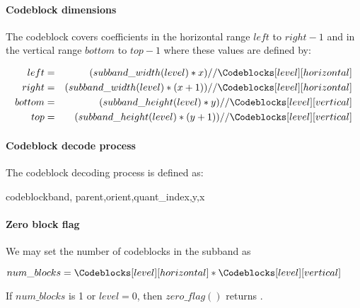 \paragraph{Codeblock dimensions\newline}

The codeblock covers coefficients in the horizontal range $left$ to $right-1$ and in the vertical
range $bottom$ to $top-1$ where these values are defined by:

\begin{eqnarray*}
  left & = & (subband\_width(level)*x)//\Codeblocks[level][horizontal] \\
  right & = & (subband\_width(level)*(x+1))//\Codeblocks[level][horizontal] \\
  bottom & = & (subband\_height(level)*y)//\Codeblocks[level][vertical] \\
  top & = & (subband\_height(level)*(y+1))//\Codeblocks[level][vertical]
\end{eqnarray*}

\paragraph{Codeblock decode process\newline}

The codeblock decoding process is defined as:

\begin{pseudo}{codeblock}{band, parent,orient,quant\_index,y,x}
    \bsEND
  \bsEND
\bsELSE
    \bsEND
  \bsEND

\bsEND

\end{pseudo}

\paragraph{Zero block flag\newline}
\label{zeroblockflag}

We may set the number of codeblocks in the subband as

$num\_blocks = \Codeblocks[level][horizontal]*\Codeblocks[level][vertical]$

If $num\_blocks$ is 1 or $level=0$, then $zero\_flag()$ returns \false.

